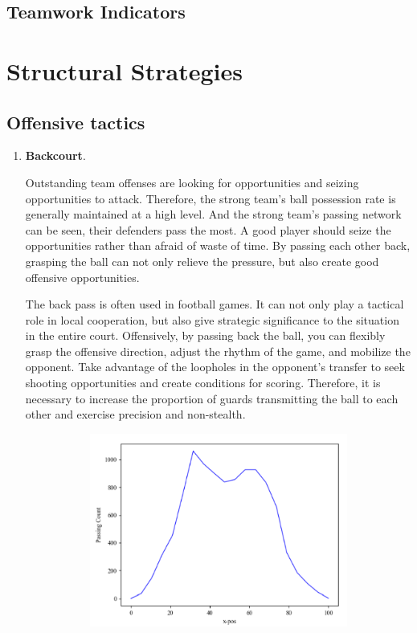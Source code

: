 \documentclass{mcmthesis}
\begin{document}
\subsection{Teamwork Indicators}
\section{Structural Strategies}
\subsection{Offensive tactics}
\begin{enumerate}[(1)]
	\item \textbf{Backcourt}.\par
	\qquad Outstanding team offenses are looking for opportunities and seizing opportunities to attack. Therefore, the strong team's ball possession rate is generally maintained at a high level. And the strong team's passing network can be seen, their defenders pass the most. A good player should seize the opportunities rather than afraid of waste of time. By passing each other back, grasping the ball can not only relieve the pressure, but also create good offensive opportunities. \par
	\qquad The back pass is often used in football games. It can not only play a tactical role in local cooperation, but also give strategic significance to the situation in the entire court. Offensively, by passing back the ball, you can flexibly grasp the offensive direction, adjust the rhythm of the game, and mobilize the opponent. Take advantage of the loopholes in the opponent's transfer to seek shooting opportunities and create conditions for scoring. Therefore, it is necessary to increase the proportion of guards transmitting the ball to each other and exercise precision and non-stealth.
	\begin{figure}[h]
		\centering
		\begin{subfigure}[b]{0.45\textwidth}
			\includegraphics[width=\textwidth]{figures/backcourt.png}

\end{subfigure}
\end{figure}
\end{enumerate}
\end{document}
